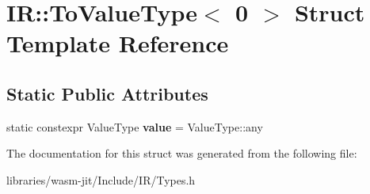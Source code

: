 \hypertarget{struct_i_r_1_1_to_value_type_3_010_01_4}{}\section{IR\+:\+:To\+Value\+Type$<$ 0 $>$ Struct Template Reference}
\label{struct_i_r_1_1_to_value_type_3_010_01_4}
\subsection*{Static Public Attributes}
\begin{DoxyCompactItemize}
\item 
\mbox{\label{struct_i_r_1_1_to_value_type_3_010_01_4_acb1412c84ffe38c999a5edfb03f8e21e}} 
static constexpr Value\+Type {\bfseries value} = Value\+Type\+::any
\end{DoxyCompactItemize}


The documentation for this struct was generated from the following file\+:\begin{DoxyCompactItemize}
\item 
libraries/wasm-\/jit/\+Include/\+I\+R/Types.\+h\end{DoxyCompactItemize}
